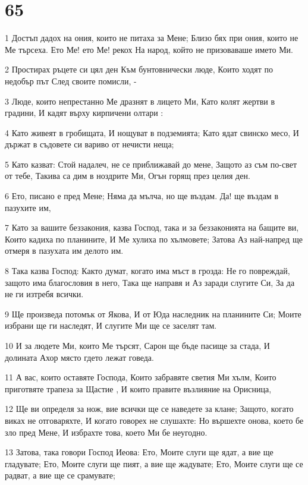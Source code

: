 \chapter{65}

\par 1 Достъп дадох на ония, които не питаха за Мене; Близо бях при ония, които не Ме търсеха. Ето Ме! ето Ме! рекох На народ, който не призоваваше името Ми.
\par 2 Простирах ръцете си цял ден Към бунтовнически люде, Които ходят по недобър път След своите помисли, -
\par 3 Люде, които непрестанно Ме дразнят в лицето Ми, Като колят жертви в градини, И кадят върху кирпичени олтари :
\par 4 Като живеят в гробищата, И нощуват в подземията; Като ядат свинско месо, И държат в съдовете си вариво от нечисти неща;
\par 5 Като казват: Стой надалеч, не се приближавай до мене, Защото аз съм по-свет от тебе, Такива са дим в ноздрите Ми, Огън горящ през целия ден.
\par 6 Ето, писано е пред Мене; Няма да мълча, но ще въздам. Да! ще въздам в пазухите им,
\par 7 Като за вашите беззакония, казва Господ, така и за беззаконията на бащите ви, Които кадиха по планините, И Ме хулиха по хълмовете; Затова Аз най-напред ще отмеря в пазухата им делото им.
\par 8 Така казва Господ: Както думат, когато има мъст в грозда: Не го повреждай, защото има благословия в него, Така ще направя и Аз заради слугите Си, За да не ги изтребя всички.
\par 9 Ще произведа потомък от Якова, И от Юда наследник на планините Си; Моите избрани ще ги наследят, И слугите Ми ще се заселят там.
\par 10 И за людете Ми, които Ме търсят, Сарон ще бъде пасище за стада, И долината Ахор място гдето лежат говеда.
\par 11 А вас, които оставяте Господа, Които забравяте светия Ми хълм, Които приготвяте трапеза за Щастие , И които правите възлияние на Орисница,
\par 12 Ще ви определя за нож, вие всички ще се наведете за клане; Защото, когато виках не отговаряхте, И когато говорех не слушахте: Но вършехте онова, което бе зло пред Мене, И избрахте това, което Ми бе неугодно.
\par 13 Затова, така говори Господ Иеова: Ето, Моите слуги ще ядат, а вие ще гладувате; Ето, Моите слуги ще пият, а вие ще жадувате; Ето, Моите слуги ще се радват, а вие ще се срамувате;
